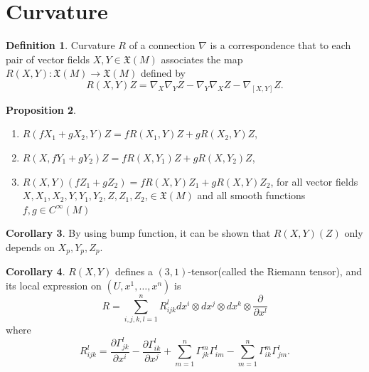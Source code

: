 \documentclass[12pt,a4paper]{book}
\newenvironment{enu}{\begin{enumerate}[(1)]}{\end{enumerate}}
\theoremstyle{definition}
\newtheorem{defn}{Definition}[section]
\newtheorem{coro}[defn]{Corollary}
\newtheorem{prop}[defn]{Proposition}
\begin{document}
\section{Curvature}
\begin{defn}
    Curvature $R$ of a connection $\nabla$ is a correspondence that to each pair of vector fields $X, Y \in \mathfrak{X}(M)$ associates the map $R(X, Y): \mathfrak{X}(M) \rightarrow \mathfrak{X}(M)$ defined by
    $$
        R(X, Y) Z=\nabla_X \nabla_Y Z-\nabla_Y \nabla_X Z-\nabla_{[X, Y]} Z .
    $$
\end{defn}
\begin{prop}
    \begin{enu}
        \item $R\left(f X_1+g X_2, Y\right) Z=f R\left(X_1, Y\right) Z+g R\left(X_2, Y\right) Z$,
        \item $R\left(X, f Y_1+g Y_2\right) Z=f R\left(X, Y_1\right) Z+g R\left(X, Y_2\right) Z$,
        \item $R(X, Y)\left(f Z_1+g Z_2\right)=f R(X, Y) Z_1+g R(X, Y) Z_2$,
        for all vector fields $X, X_1, X_2, Y, Y_1, Y_2, Z, Z_1, Z_2$,$\in \mathfrak{X}(M)$ and all smooth functions $f, g \in C^{\infty}(M)$
    \end{enu}
\end{prop}
\begin{coro}
    By using bump function, it can be shown that $R(X,Y)(Z) $ only depends on $X_p,Y_p,Z_p$.
\end{coro}
\begin{coro}
    $R(X,Y)$ defines a $(3,1)$-tensor(called the Riemann tensor), and its local expression  on $(U,x^1,\dots,x^n)$ is
    $$
        R=\sum_{i, j, k, l=1}^n R_{i j k}^l d x^i \otimes d x^j \otimes d x^k \otimes \frac{\partial}{\partial x^l}
    $$
    where
    $$
        R_{i j k}^l=\frac{\partial \Gamma_{j k}^l}{\partial x^i}-\frac{\partial \Gamma_{i k}^l}{\partial x^j}+\sum_{m=1}^n \Gamma_{j k}^m \Gamma_{i m}^l-\sum_{m=1}^n \Gamma_{i k}^m \Gamma_{j m}^l .
    $$
\end{coro}
\end{document}
